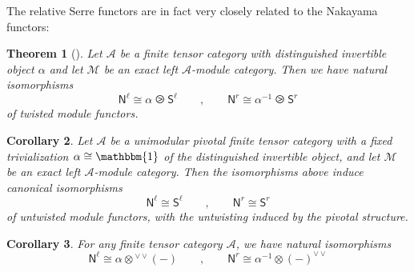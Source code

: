 \documentclass[11pt]{article}
\newcommand{\N}{\mathbb{N}}
\newcommand{\cA}{\mathcal{A}}
\newtheorem{theorem}{Theorem}[section]
\newtheorem{corollary}[theorem]{Corollary}
\theoremstyle{definition}
\begin{document}
The relative Serre functors are in fact very closely related to the Nakayama functors:

\begin{theorem}[{\cite[Theorem 4.26]{fss}}]
Let $\mathcal{A}$ be a finite tensor category with distinguished invertible object $\alpha$ and let $\mathcal{M}$ be an exact left $\mathcal{A}$-module category. Then we have natural isomorphisms
$$ \mathsf{N}^\ell \cong \alpha \ogreaterthan  \mathsf{S}^\ell \qquad , \qquad  \mathsf{N}^r \cong \alpha^{-1} \ogreaterthan  \mathsf{S}^r $$
of twisted module functors.
\end{theorem}





\begin{corollary}\label{corfss}
Let $\mathcal{A}$ be  a unimodular pivotal finite tensor category with a fixed trivialization
	$\alpha \cong \mathbbm{1}$ of the distinguished invertible object, and let $\mathcal{M}$ be an exact left $\mathcal{A}$-module category. Then the isomorphisms above induce canonical isomorphisms
	$$ \mathsf{N}^\ell \cong  \mathsf{S}^\ell \qquad , \qquad  \mathsf{N}^r \cong  \mathsf{S}^r $$
of untwisted module functors, with the untwisting induced by the pivotal structure.
 \end{corollary}
 
 




\begin{corollary}\label{cor:N=alpha_vee_vee}
For any   finite tensor category $\mathcal{A}$,  we have natural isomorphisms $$ \mathsf{N}^\ell \cong \alpha \otimes  {}^{\vee \vee} (-) \qquad , \qquad  \mathsf{N}^r \cong \alpha^{-1} \otimes  (-)^{\vee \vee} $$
\end{corollary}
\end{document}
